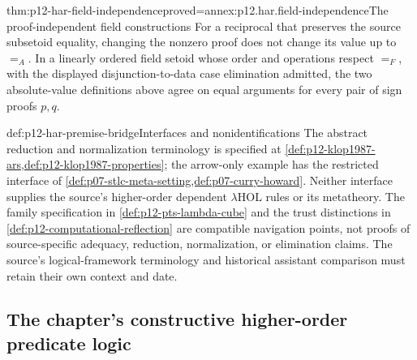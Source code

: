 \begin{hbtheorem}{thm:p12-har-field-independence}{proved=annex:p12.har.field-independence}{The proof-independent field constructions}
For a reciprocal that preserves the source subsetoid equality, changing
the nonzero proof does not change its value up to \(=_A\).
In a linearly ordered field setoid whose order and operations respect
\(=_F\), with the displayed disjunction-to-data case elimination
admitted, the two absolute-value definitions above agree on equal
arguments for every pair of sign proofs \(p,q\).
\end{hbtheorem}

\begin{proofboundary}{def:p12-har-premise-bridge}{Interfaces and nonidentifications}
The abstract reduction and normalization terminology is specified at
\cref{def:p12-klop1987-ars,def:p12-klop1987-properties}; the arrow-only
example has the restricted interface of
\cref{def:p07-stlc-meta-setting,def:p07-curry-howard}. Neither interface
supplies the source's higher-order dependent \(\lambda\mathrm{HOL}\)
rules or its metatheory. The family specification in
\cref{def:p12-pts-lambda-cube} and the trust distinctions in
\cref{def:p12-computational-reflection} are compatible navigation points,
not proofs of source-specific adequacy, reduction, normalization, or
elimination claims. The source's logical-framework terminology and historical
assistant comparison must retain their own context and date.
\end{proofboundary}

\subsection{The chapter's constructive higher-order predicate logic}

